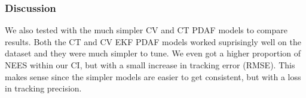 \subsubsection{Discussion}
We also tested with the much simpler CV and CT PDAF models to compare results. Both the CT and CV EKF PDAF models worked suprisingly well on the dataset and they were much simpler to tune. We even got a higher proportion of NEES within our CI, but with a small increase in tracking error (RMSE). This makes sense since the simpler models are easier to get consistent, but with a loss in tracking precision. 